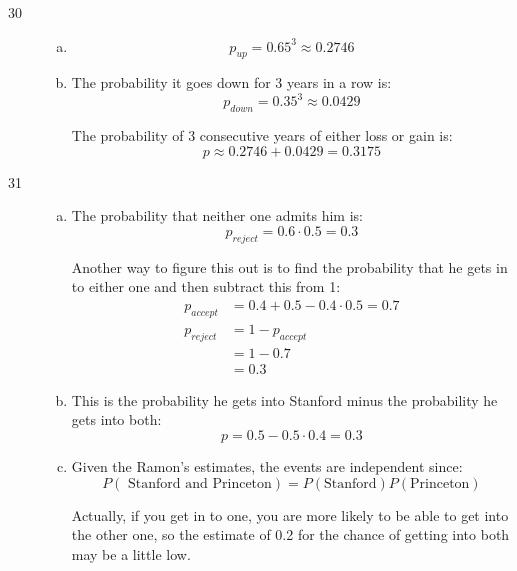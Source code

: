 \documentclass[letterpaper, landscape]{exam}
\begin{document}
\begin{description}
      \item[30]
        \begin{enumerate}[(a)]
          \item 
            \[
              p_{up} = 0.65^3 \approx \boxed{ 0.2746 }
            \]

          \item 
            The probability it goes down for 3 years in a row is:
            \[
              p_{down} = 0.35^3 \approx 0.0429
            \]

            The probability of 3 consecutive years of either loss or gain is:
            \[
              p \approx 0.2746 + 0.0429 = \boxed{ 0.3175 }
            \]

        \end{enumerate}

      \item[31]
        \begin{enumerate}[(a)]
          \item The probability that neither one admits him is:
            \[
              p_{reject} = 0.6 \cdot 0.5 = \boxed{ 0.3 }
            \]

            Another way to figure this out is to find the probability that he
            gets in to either one and then subtract this from 1:
            \begin{align*}
              p_{accept} & = 0.4 + 0.5 - 0.4 \cdot 0.5 = 0.7 \\
              p_{reject} & = 1 - p_{accept} \\
                         & = 1 - 0.7 \\
                         & = 0.3
            \end{align*}

          \item
            This is the probability he gets into Stanford minus the probability
            he gets into both:
            \[
              p = 0.5 - 0.5 \cdot 0.4 = \boxed{ 0.3 }
            \]
            
          \item Given the Ramon's estimates, the events are independent since:
            \[
              P(\text{ Stanford and Princeton}) = P(\text{Stanford}) P(\text{Princeton})
            \]

            Actually, if you get in to one, you are more likely to be able to
            get into the other one, so the estimate of 0.2 for the chance of
            getting into both may be a little low.


\end{enumerate}
\end{description}
\end{document}

